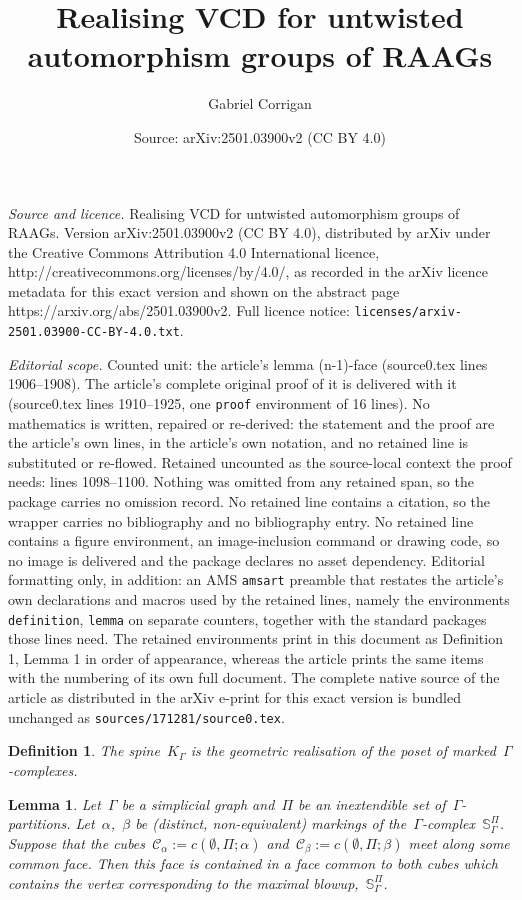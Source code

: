 \documentclass[10pt,a4paper]{amsart}
\title{Realising VCD for untwisted automorphism groups of RAAGs}
\author{Gabriel Corrigan}
\date{Source: arXiv:2501.03900v2 (CC BY 4.0)}
\newtheorem{definition}{Definition}
\newtheorem{lemma}{Lemma}
\newcommand{\salb}[1]{\mathbb{S}_\Gamma^{#1}} %
\newcommand{\spine}{K_{\Gamma}} %
\begin{document}
\maketitle

\noindent\emph{Source and licence.} Realising VCD for untwisted automorphism groups of RAAGs. Version arXiv:2501.03900v2 (CC BY 4.0), distributed by arXiv under the Creative Commons Attribution 4.0 International licence, http://creativecommons.org/licenses/by/4.0/, as recorded in the arXiv licence metadata for this exact version and shown on the abstract page https://arxiv.org/abs/2501.03900v2. Full licence notice: \texttt{licenses/arxiv-2501.03900-CC-BY-4.0.txt}.\par\smallskip

\noindent\textit{Editorial scope.} Counted unit: the article's lemma (n-1)-face (source0.tex lines 1906--1908). The article's complete original proof of it is delivered with it (source0.tex lines 1910--1925, one \texttt{proof} environment of 16 lines). No mathematics is written, repaired or re-derived: the statement and the proof are the article's own lines, in the article's own notation, and no retained line is substituted or re-flowed.  Retained uncounted as the source-local context the proof needs: lines 1098--1100.  Nothing was omitted from any retained span, so the package carries no omission record.  No retained line contains a citation, so the wrapper carries no bibliography and no bibliography entry.  No retained line contains a figure environment, an image-inclusion command or drawing code, so no image is delivered and the package declares no asset dependency.  Editorial formatting only, in addition: an AMS \texttt{amsart} preamble that restates the article's own declarations and macros used by the retained lines, namely the environments \texttt{definition}, \texttt{lemma} on separate counters, together with the standard packages those lines need.  The retained environments print in this document as Definition 1, Lemma 1 in order of appearance, whereas the article prints the same items with the numbering of its own full document.  The complete native source of the article as distributed in the arXiv e-print for this exact version is bundled unchanged as \texttt{sources/171281/source0.tex}.
\begin{definition}\label{def:untwisted spine}
    The \emph{spine}~$\spine$ is the geometric realisation of the poset of marked~$\Gamma$-complexes.
\end{definition}

\begin{lemma}\label{lem:meet on (n-1)-face}
    Let~$\Gamma$ be a simplicial graph and~$\Pi$ be an inextendible set of~$\Gamma$-partitions. Let~$\alpha$,~$\beta$ be (distinct, non-equivalent) markings of the~$\Gamma$-complex~$\salb{\Pi}$. Suppose that the cubes~$\mathcal{C}_{\alpha} := c(\emptyset, \Pi; \alpha)$ and~$\mathcal{C}_{\beta} := c(\emptyset, \Pi; \beta)$ meet along some common face. Then this face is contained in a face common to both cubes which contains the vertex corresponding to the maximal blowup,~$\salb{\Pi}$.
\end{lemma}
\end{document}
